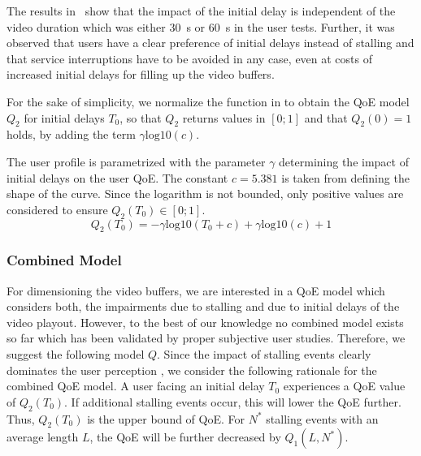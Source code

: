 The results in~\cite{Hossfeld2012c} show that the impact of the initial delay is independent of the video duration which was either \SI{30}{\second} or \SI{60}{\second} in the user tests.
Further, it was observed that users have a clear preference of initial delays instead
of stalling and that service interruptions have to be avoided in any case, even at costs of increased initial delays for filling up the video buffers. 

For the sake of simplicity, we normalize the function in  to obtain the \gls{QoE} model \(Q_2\) for initial delays \(T_0\), so that \(Q_2\) returns values in \(\left[0;1\right]\) and that \(Q_2(0)=1\) holds, by adding the term \(\gamma \mathrm{log10}\left(c\right)\).

The user profile is parametrized with the parameter \(\gamma\) determining the impact of initial delays on the user \gls{QoE}.
The constant \(c=5.381\) is taken from  defining the shape of the curve. 
Since the logarithm is not bounded, only positive values are considered to ensure \(Q_2(T_0) \in [0;1]\).
\begin{equation*}
Q_2(T_0)= -\gamma \mathrm{log10}\left(T_0 + c\right) + \gamma \mathrm{log10}\left(c\right)+ 1 
\end{equation*}

\subsubsection*{Combined  Model}\label{sec:application:qoe_user_behaviour:typical_user_scenarios:youtube_qoe:combined}
For dimensioning the video buffers, we are interested in a \gls{QoE} model which considers both, the impairments due to stalling and due to initial delays of the video playout.
However, to the best of our knowledge no combined model exists so far which has been validated by proper subjective user studies.
Therefore, we suggest the following model \(Q\).
Since the impact of stalling events clearly dominates the user perception \cite{Hossfeld2012a,Hossfeld2012c}, we consider the following rationale for the combined QoE model.
A user facing an initial delay \(T_0\) experiences a \gls{QoE} value of \(Q_2(T_0)\).
If additional stalling events occur, this will lower the QoE further.
Thus, \(Q_2(T_0)\) is the upper bound of \gls{QoE}.
For \(N^*\) stalling events with an average length \(L\), the \gls{QoE} will be further decreased by \(Q_1(L,N^*)\).

